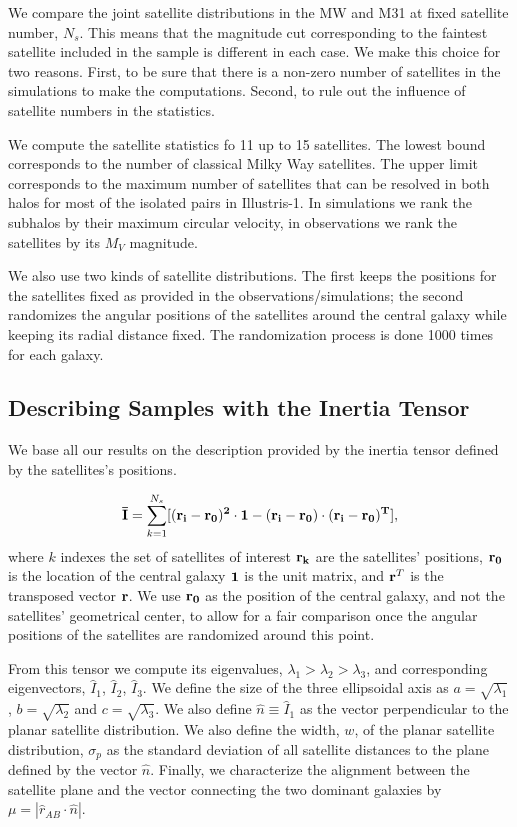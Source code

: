 \documentclass[a4paper,fleqn,usenatbib]{mnras}
\begin{document}
We compare the joint satellite distributions in the MW and M31 at fixed
satellite number, $N_s$.
This means that the magnitude cut corresponding to the faintest
satellite included in the sample is different in each case.
We make this choice for two reasons. 
First, to be sure that there is a non-zero number of satellites in the
simulations to make the computations.  
Second, to rule out the influence of satellite numbers in the
statistics. 

We compute the satellite statistics fo 11 up to 15 satellites.
The lowest bound corresponds to the number of classical Milky Way
satellites.
The upper limit corresponds to the maximum number of satellites that
can be resolved in both halos for most of the isolated pairs in Illustris-1.
In simulations we rank the subhalos by their maximum
circular velocity, in observations we rank the satellites by its $M_V$
magnitude. 

We also use two kinds of satellite distributions. 
The first keeps the positions for the satellites fixed as provided in
the observations/simulations; the second randomizes the angular positions of
the satellites around the central galaxy while keeping its radial
distance fixed. The randomization process is done 1000 times for each
galaxy. 


\subsection{Describing Samples with the Inertia Tensor}
We base all our results on the description provided by the inertia
tensor defined by the satellites's positions.  

\begin{equation}
{\bf{\bar{I}}} = \sum_{k=1}^{N_s}[(\bf{r}_i - \bf{r}_0)^2\cdot \bf{1} -
  (\bf{r}_i-\bf{r}_0)\cdot (\bf{r}_i - \bf{r}_0)^{T}],
\end{equation}
%
where $k$ indexes the set of satellites of interest
$\bf{r}_k$ are the satellites' positions, $\bf{r}_{0}$ is the location
of the central galaxy $\bf{1}$ is the unit matrix,  and  
${\bf r}^T$ is the transposed vector $\bf{r}$. 
We use $\bf{r}_0$ as the position of the central galaxy, and not the
satellites' geometrical center, to allow for a fair comparison once
the angular positions of the satellites are randomized around this
point. 

From this tensor we compute its eigenvalues,
$\lambda_1>\lambda_2>\lambda_3$, and corresponding eigenvectors,
$\hat{I}_1$, $\hat{I}_2$, $\hat{I}_3$.
We define the size of the three ellipsoidal axis as
$a=\sqrt{\lambda_1}$, $b=\sqrt{\lambda_2}$ and $c=\sqrt{\lambda_3}$.
We also define $\hat{n}\equiv \hat{I}_1$ as the vector perpendicular to the
planar satellite distribution. 
We also define the width, $w$, of the planar satellite distribution,
$\sigma_p$ as the standard deviation of all satellite distances to the
plane defined by the vector $\hat{n}$. 
Finally, we characterize the alignment between the satellite plane and the
vector connecting the two dominant galaxies by $\mu=|\hat{r}_{AB}\cdot
\hat{n}|$.
\end{document}

